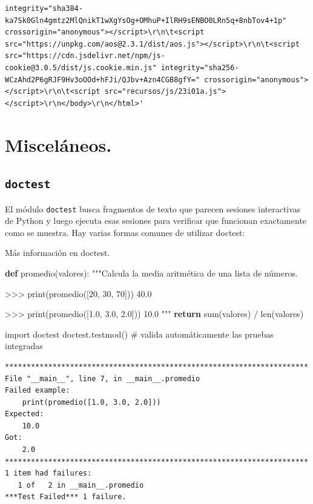 \documentclass[
  spanish,
  letterpaper,
]{scrbook}
\newenvironment{Shaded}{\begin{snugshade}}{\end{snugshade}}
\newcommand{\BuiltInTok}[1]{\textcolor[rgb]{0.00,0.23,0.31}{#1}}
\newcommand{\CommentTok}[1]{\textcolor[rgb]{0.37,0.37,0.37}{#1}}
\newcommand{\ControlFlowTok}[1]{\textcolor[rgb]{0.00,0.23,0.31}{\textbf{#1}}}
\newcommand{\ImportTok}[1]{\textcolor[rgb]{0.00,0.46,0.62}{#1}}
\newcommand{\KeywordTok}[1]{\textcolor[rgb]{0.00,0.23,0.31}{\textbf{#1}}}
\newcommand{\NormalTok}[1]{\textcolor[rgb]{0.00,0.23,0.31}{#1}}
\newcommand{\OperatorTok}[1]{\textcolor[rgb]{0.37,0.37,0.37}{#1}}
\theoremstyle{definition}
\theoremstyle{remark}
\begin{document}
\begin{verbatim}
integrity="sha384-ka7Sk0Gln4gmtz2MlQnikT1wXgYsOg+OMhuP+IlRH9sENBO0LRn5q+8nbTov4+1p" crossorigin="anonymous"></script>\r\n\t<script src="https://unpkg.com/aos@2.3.1/dist/aos.js"></script>\r\n\t<script src="https://cdn.jsdelivr.net/npm/js-cookie@3.0.5/dist/js.cookie.min.js" integrity="sha256-WCzAhd2P6gRJF9Hv3oOOd+hFJi/QJbv+Azn4CGB8gfY=" crossorigin="anonymous"></script>\r\n\t<script src="recursos/js/23i01a.js"></script>\r\n</body>\r\n</html>'
\end{verbatim}

\section{Misceláneos.}\label{misceluxe1neos.}

\subsection{\texorpdfstring{\texttt{doctest}}{doctest}}\label{doctest}

El módulo \texttt{doctest} busca fragmentos de texto que parecen
sesiones interactivas de Python y luego ejecuta esas sesiones para
verificar que funcionan exactamente como se muestra. Hay varias formas
comunes de utilizar doctest:

Más información en doctest.

\begin{Shaded}
\begin{Highlighting}[]
\KeywordTok{def}\NormalTok{ promedio(valores):}
    \CommentTok{"""Calcula la media aritmética de una lista de números.}

\CommentTok{    \textgreater{}\textgreater{}\textgreater{} print(promedio([20, 30, 70]))}
\CommentTok{    40.0}

\CommentTok{    \textgreater{}\textgreater{}\textgreater{} print(promedio([1.0, 3.0, 2.0]))}
\CommentTok{    10.0    }
\CommentTok{    """}
    \ControlFlowTok{return} \BuiltInTok{sum}\NormalTok{(valores) }\OperatorTok{/} \BuiltInTok{len}\NormalTok{(valores)}

\ImportTok{import}\NormalTok{ doctest}
\NormalTok{doctest.testmod()   }\CommentTok{\# valida automáticamente las pruebas integradas}
\end{Highlighting}
\end{Shaded}

\begin{verbatim}
**********************************************************************
File "__main__", line 7, in __main__.promedio
Failed example:
    print(promedio([1.0, 3.0, 2.0]))
Expected:
    10.0    
Got:
    2.0
**********************************************************************
1 item had failures:
   1 of   2 in __main__.promedio
***Test Failed*** 1 failure.
\end{verbatim}
\end{document}
